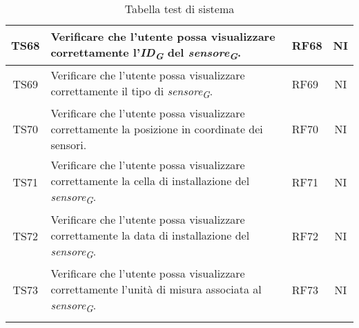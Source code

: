 \begin{longtable}{|c|p{5cm}|>{\raggedright}p{2cm}|c|}
        \hline
        TS68 & Verificare che l'utente possa visualizzare correttamente l'\textit{ID}\textsubscript{\textit{G}} del \textit{sensore}\textsubscript{\textit{G}}. & RF68 & NI \\
        \hline
        TS69 & Verificare che l'utente possa visualizzare correttamente il tipo di \textit{sensore}\textsubscript{\textit{G}}. & RF69 & NI \\
        \hline
        TS70 & Verificare che l'utente possa visualizzare correttamente la posizione in coordinate dei sensori. & RF70 & NI \\
        \hline
        TS71 & Verificare che l'utente possa visualizzare correttamente la cella di installazione del \textit{sensore}\textsubscript{\textit{G}}. & RF71 & NI \\
        \hline
        TS72 & Verificare che l'utente possa visualizzare correttamente la data di installazione del \textit{sensore}\textsubscript{\textit{G}}. & RF72 & NI \\
        \hline
        TS73 & Verificare che l'utente possa visualizzare correttamente l'unità di misura associata al \textit{sensore}\textsubscript{\textit{G}}. & RF73 & NI \\
        \hline
    \caption{Tabella test di sistema}
\end{longtable}